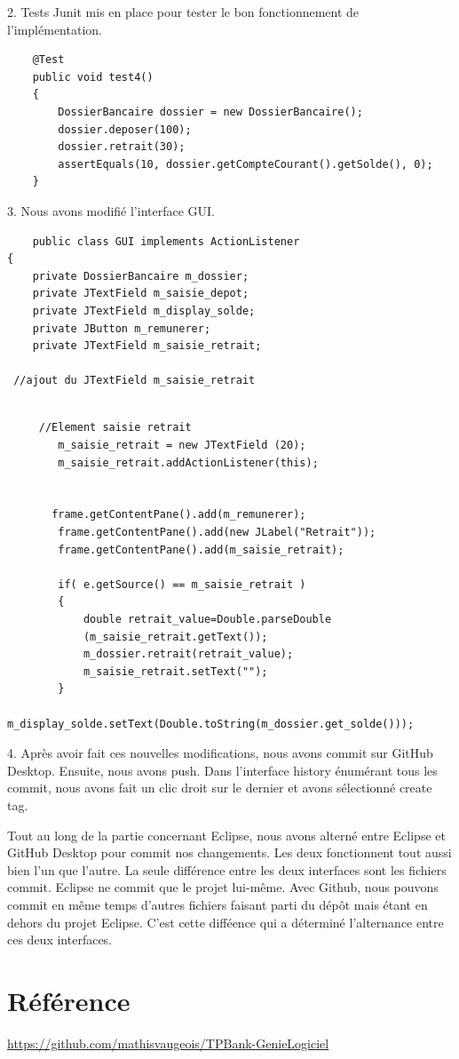 \documentclass{article}
\begin{document}
2.
Tests Junit mis en place pour tester le bon fonctionnement de l'implémentation.
\begin{lstlisting}
    @Test  
	public void test4()
	{
		DossierBancaire dossier = new DossierBancaire();
		dossier.deposer(100);
		dossier.retrait(30);
		assertEquals(10, dossier.getCompteCourant().getSolde(), 0);
	}
\end{lstlisting}

3.
Nous avons modifié l'interface GUI.

\begin{lstlisting}
    public class GUI implements ActionListener 
{
	private DossierBancaire m_dossier;
	private JTextField m_saisie_depot;
	private JTextField m_display_solde;
	private JButton m_remunerer;
	private JTextField m_saisie_retrait;

 //ajout du JTextField m_saisie_retrait
	
\end{lstlisting}
\begin{lstlisting}
     //Element saisie retrait
        m_saisie_retrait = new JTextField (20);
        m_saisie_retrait.addActionListener(this);


       frame.getContentPane().add(m_remunerer); 
        frame.getContentPane().add(new JLabel("Retrait"));
        frame.getContentPane().add(m_saisie_retrait);

        if( e.getSource() == m_saisie_retrait )
    	{
    		double retrait_value=Double.parseDouble
            (m_saisie_retrait.getText());
    		m_dossier.retrait(retrait_value);
    		m_saisie_retrait.setText("");
    	}
    	m_display_solde.setText(Double.toString(m_dossier.get_solde())); 
\end{lstlisting}

4. Après avoir fait ces nouvelles modifications, nous avons commit sur GitHub Desktop. Ensuite, nous avons push. Dans l'interface history énumérant tous les commit, nous avons fait un clic droit sur le dernier et avons sélectionné create tag.

Tout au long de la partie concernant Eclipse, nous avons alterné entre Eclipse et GitHub Desktop pour commit nos changements. Les deux fonctionnent tout aussi bien l'un que l'autre. La seule différence entre les deux interfaces sont les fichiers commit. Eclipse ne commit que le projet lui-même. Avec Github, nous pouvons commit en même temps d'autres fichiers faisant parti du dépôt mais étant en dehors du projet Eclipse. C'est cette difféence qui a déterminé l'alternance entre ces deux interfaces.
\section*{Référence}
\url{https://github.com/mathisvaugeois/TPBank-GenieLogiciel}
\end{document}
